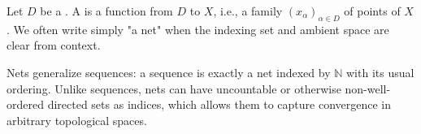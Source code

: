 \begin{definition} \label{definition:net_in_a_topological_space}

    Let $D$ be a . A  is a function from $D$ to $X$, i.e., a family $(x_\alpha)_{\alpha \in D}$ of points of $X$. We often write simply "a net" when the indexing set and ambient space are clear from context.

    Nets generalize sequences: a sequence is exactly a net indexed by $\mathbb{N}$ with its usual ordering. Unlike sequences, nets can have uncountable or otherwise non-well-ordered directed sets as indices, which allows them to capture convergence in arbitrary topological spaces.
\end{definition}
